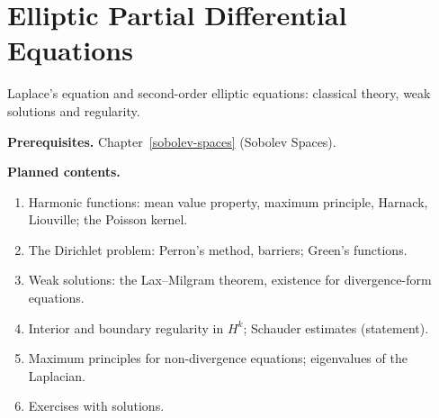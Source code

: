 \chapter{Elliptic Partial Differential Equations}\label{elliptic-pde}

Laplace's equation and second-order elliptic equations: classical theory, weak solutions and
regularity.

\noindent\textbf{Prerequisites.} Chapter~\ref{sobolev-spaces} (Sobolev Spaces).

\noindent\textbf{Planned contents.}
\begin{enumerate}
\item Harmonic functions: mean value property, maximum principle, Harnack, Liouville; the Poisson kernel.
\item The Dirichlet problem: Perron's method, barriers; Green's functions.
\item Weak solutions: the Lax--Milgram theorem, existence for divergence-form equations.
\item Interior and boundary regularity in $H^k$; Schauder estimates (statement).
\item Maximum principles for non-divergence equations; eigenvalues of the Laplacian.
\item Exercises with solutions.
\end{enumerate}

